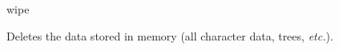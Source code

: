 
\begin{command}{wipe}{}

\syntax{\obligatory{()}}

\begin{poydescription}
Deletes the data stored in memory (all character data, trees, \emph{etc.}).
\end{poydescription}

\begin{poyexamples}
\end{poyexamples}
\end{command}

